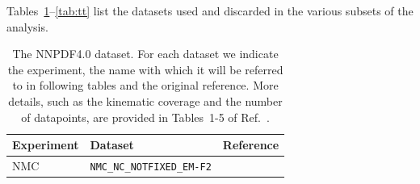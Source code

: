\documentclass[11pt,a4paper]{article}
\begin{document}
Tables~\ref{tab:dataset_full}--\ref{tab:tt} list the datasets used and discarded in the various subsets of the analysis.
\begin{table}[htbp]
\centering
\small
\begin{tabular}{lll}
\toprule
Experiment & Dataset & Reference \\
\midrule
NMC & \texttt{NMC\_NC\_NOTFIXED\_EM-F2} & \cite{}\\
\bottomrule
\end{tabular}
\caption{The NNPDF4.0 dataset. For each dataset we indicate the experiment, the name with which it will be referred to in following  tables and the original reference. More details, such as the kinematic coverage and the number of datapoints, are provided in Tables~1-5 of Ref.~\cite{NNPDF:2021njg}.}
\label{tab:dataset_full}
\end{table}
\end{document}
